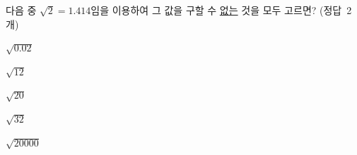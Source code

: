 다음 중 $\sqrt{2}=1.414$임을 이용하여 그 값을 구할 수 \underline{없는} 것을 모두 고르면? \mbox{(정답 2개)}
\begin{choices32}{\rule[-3ex]{0pt}{8ex}$\sqrt{0.02}$}{\rule[-3ex]{0pt}{8ex}$\sqrt{12}$}{\rule[-3ex]{0pt}{8ex}$\sqrt{20}$}{\rule[-3ex]{0pt}{8ex}$\sqrt{32}$}{\rule[-3ex]{0pt}{8ex}$\sqrt{20000}$}\end{choices32}
